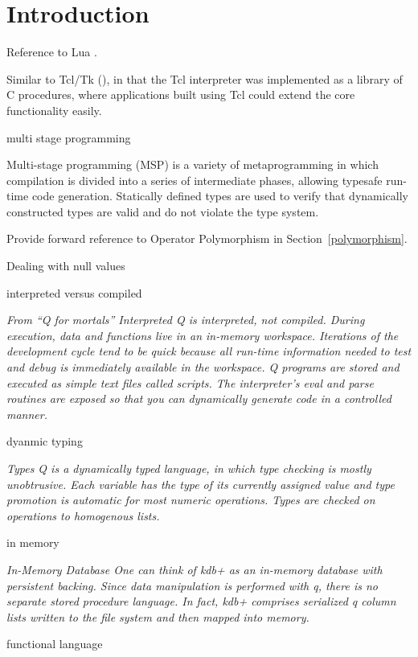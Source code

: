 
\section{Introduction}

\be
\item 
Reference to Lua \cite{Lua2011}.

Similar to Tcl/Tk (\cite{Ousterhout2009}), in that the Tcl interpreter 
was implemented as a library of C procedures, where applications 
built using Tcl could extend the core functionality easily.

\item multi stage programming

Multi-stage programming (MSP) is a variety of metaprogramming in which
compilation is divided into a series of intermediate phases, allowing typesafe
run-time code generation. Statically defined types are used to verify that
dynamically constructed types are valid and do not violate the type system.

Provide forward reference to Operator Polymorphism in
Section~\ref{polymorphism}.

\item 

Dealing with null values 

\item interpreted versus compiled

{\em  From ``Q for mortals''
  Interpreted Q is interpreted, not compiled. During execution, data and
  functions live in an in-memory workspace. Iterations of the development cycle
  tend to be quick because all run-time information needed to test and debug is
  immediately available in the workspace. Q programs are stored and executed as
  simple text files called scripts. The interpreter's eval and parse routines
  are exposed so that you can dynamically generate code in a controlled manner.

}
\item dyanmic typing

  {\em 
  Types Q is a dynamically typed language, in which type checking is mostly
  unobtrusive. Each variable has the type of its currently assigned value and
  type promotion is automatic for most numeric operations. Types are checked on
  operations to homogenous lists.
}

\item in memory

  {\em 
  In-Memory Database One can think of kdb+ as an in-memory database with
  persistent backing. Since data manipulation is performed with q, there is no
  separate stored procedure language. In fact, kdb+ comprises serialized q
  column lists written to the file system and then mapped into memory.
}

\item functional language 
\ee
